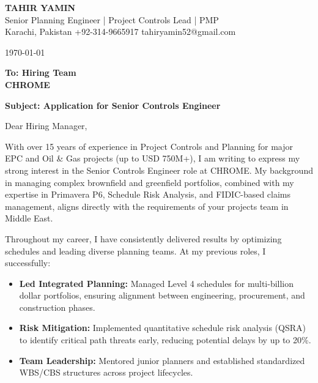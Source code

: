 \documentclass[11pt,a4paper]{article}
\begin{document}
\begin{center}
    {\Huge \textbf{\color{awesome-darknight} TAHIR YAMIN}} \\[0.2cm]
    {\Large \color{awesome-gray} Senior Planning Engineer | Project Controls Lead | PMP} \\[0.3cm]
    
    \small \color{light-gray}
    Karachi, Pakistan \quad \textbullet \quad 
    +92-314-9665917 \quad \textbullet \quad 
    tahiryamin52@gmail.com
\end{center}

\vspace{0.8cm}
\today
\vspace{0.5cm}

\textbf{To: Hiring Team} \\
\textbf{CHROME} \\
\vspace{0.5cm}

\textbf{Subject: Application for Senior Controls Engineer}

\vspace{0.5cm}

Dear Hiring Manager,

With over 15 years of experience in Project Controls and Planning for major EPC and Oil \& Gas projects (up to USD 750M+), I am writing to express my strong interest in the Senior Controls Engineer role at CHROME. My background in managing complex brownfield and greenfield portfolios, combined with my expertise in Primavera P6, Schedule Risk Analysis, and FIDIC-based claims management, aligns directly with the requirements of your projects team in Middle East.

Throughout my career, I have consistently delivered results by optimizing schedules and leading diverse planning teams. At my previous roles, I successfully:

\begin{itemize}
    \item \textbf{Led Integrated Planning:} Managed Level 4 schedules for multi-billion dollar portfolios, ensuring alignment between engineering, procurement, and construction phases.
    \item \textbf{Risk Mitigation:} Implemented quantitative schedule risk analysis (QSRA) to identify critical path threats early, reducing potential delays by up to 20\%.
    \item \textbf{Team Leadership:} Mentored junior planners and established standardized WBS/CBS structures across project lifecycles.
\end{itemize}
\end{document}
